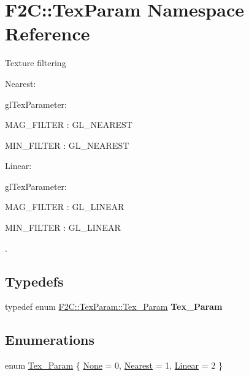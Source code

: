 \hypertarget{namespace_f2_c_1_1_tex_param}{
\section{F2C::TexParam Namespace Reference}
\label{namespace_f2_c_1_1_tex_param}
}


Texture filtering \par
 Nearest: \par
 glTexParameter: \par
 MAG\_\-FILTER : GL\_\-NEAREST \par
 MIN\_\-FILTER : GL\_\-NEAREST \par
 \par
 Linear: \par
 glTexParameter: \par
 MAG\_\-FILTER : GL\_\-LINEAR \par
 MIN\_\-FILTER : GL\_\-LINEAR \par
 \par
.  


\subsection*{Typedefs}
\begin{DoxyCompactItemize}
\item 
\hypertarget{namespace_f2_c_1_1_tex_param_a54aa0d8c49750a30011253cd112b1bfa}{
typedef enum \hyperlink{namespace_f2_c_1_1_tex_param_a64299c3972944468af4e8b0394c936c6}{F2C::TexParam::Tex\_\-Param} {\bfseries Tex\_\-Param}}
\label{namespace_f2_c_1_1_tex_param_a54aa0d8c49750a30011253cd112b1bfa}

\end{DoxyCompactItemize}
\subsection*{Enumerations}
\begin{DoxyCompactItemize}
\item 
enum \hyperlink{namespace_f2_c_1_1_tex_param_a64299c3972944468af4e8b0394c936c6}{Tex\_\-Param} \{ \hyperlink{namespace_f2_c_1_1_tex_param_a64299c3972944468af4e8b0394c936c6aca6170cd53032a5477e3c636e400c6ff}{None} =  0, 
\hyperlink{namespace_f2_c_1_1_tex_param_a64299c3972944468af4e8b0394c936c6a24ebbb7dc474946d5c959d8c4a34e3f1}{Nearest} =  1, 
\hyperlink{namespace_f2_c_1_1_tex_param_a64299c3972944468af4e8b0394c936c6ab324773649bec041f907ab81581a53bf}{Linear} =  2
 \}
\end{DoxyCompactItemize}


